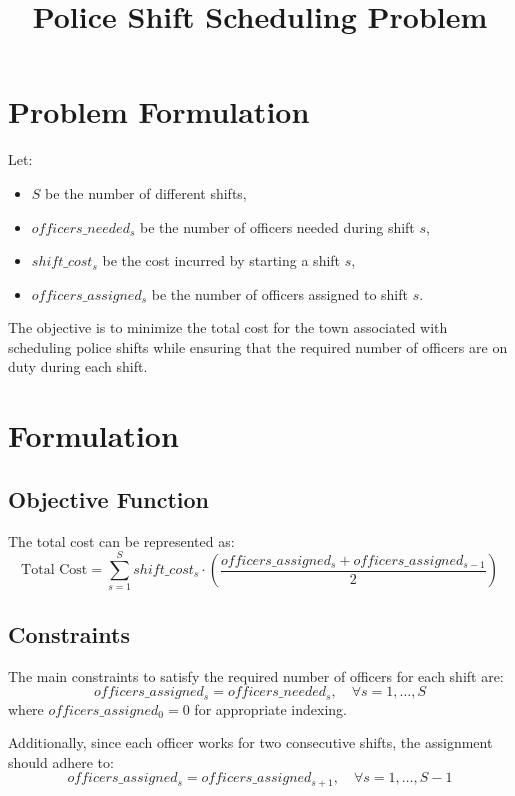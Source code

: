 \documentclass{article}
\begin{document}
\title{Police Shift Scheduling Problem}
\author{}
\date{}
\maketitle

\section*{Problem Formulation}

Let:
\begin{itemize}
    \item \( S \) be the number of different shifts,
    \item \( officers\_needed_s \) be the number of officers needed during shift \( s \),
    \item \( shift\_cost_s \) be the cost incurred by starting a shift \( s \),
    \item \( officers\_assigned_s \) be the number of officers assigned to shift \( s \).
\end{itemize}

The objective is to minimize the total cost for the town associated with scheduling police shifts while ensuring that the required number of officers are on duty during each shift.

\section*{Formulation}

\subsection*{Objective Function}
The total cost can be represented as:
\[
\text{Total Cost} = \sum_{s=1}^{S} shift\_cost_s \cdot \left(\frac{officers\_assigned_s + officers\_assigned_{s-1}}{2}\right)
\]

\subsection*{Constraints}
The main constraints to satisfy the required number of officers for each shift are:
\[
officers\_assigned_s = officers\_needed_s, \quad \forall s = 1, \ldots, S
\]
where \( officers\_assigned_0 = 0 \) for appropriate indexing.

Additionally, since each officer works for two consecutive shifts, the assignment should adhere to:
\[
officers\_assigned_s = officers\_assigned_{s+1}, \quad \forall s = 1, \ldots, S-1
\]
\end{document}
